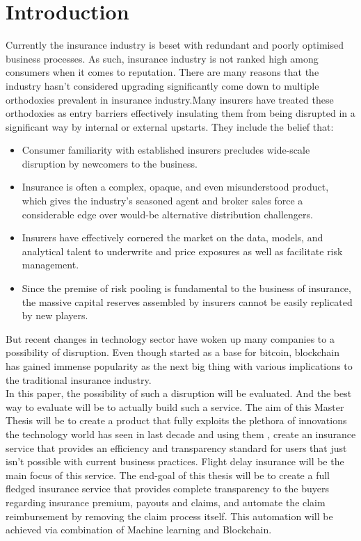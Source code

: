 \chapter{Introduction}

Currently the insurance industry is beset with redundant and poorly optimised business processes. As such, insurance industry is not ranked high among consumers when it comes to reputation\cite{lauraMazzucaToops2014HarrisPropertyCasualty360}. There are many reasons that the industry hasn't considered upgrading significantly come down to multiple orthodoxies prevalent in insurance industry.Many insurers have treated these orthodoxies as entry barriers effectively insulating them from being disrupted in a significant way by internal or external upstarts. They include the belief that\cite{Shaw2016InsurersDisrupted}:
\begin{itemize}
    \item Consumer familiarity with established insurers precludes wide-scale disruption by newcomers to the business.
    \item Insurance is often a complex, opaque, and even misunderstood product, which gives the industry’s seasoned agent and broker sales force a considerable edge over would-be alternative distribution challengers.
    \item Insurers have effectively cornered the market on the data, models, and analytical talent to underwrite and price exposures as well as facilitate risk management.
    \item Since the premise of risk pooling is fundamental to the business of insurance, the massive capital reserves assembled by insurers cannot be easily replicated by new players.
\end{itemize}

But recent changes in technology sector have woken up many companies to a possibility of disruption. Even though started as a base for bitcoin, blockchain has gained immense popularity as the next big thing with various implications to the traditional insurance industry.
\\ In this paper, the possibility of such a disruption will be evaluated. And the best way to evaluate will be to actually build such a service. The aim of this Master Thesis will be to create a product that fully exploits the plethora of innovations the technology world has seen in last decade and using them , create an insurance service that provides an efficiency and transparency standard for users that just isn't possible with current business practices. Flight delay insurance will be the main focus of this service. The end-goal of this thesis will be to create a full fledged insurance service that provides complete transparency to the buyers regarding insurance premium, payouts and claims, and automate the claim reimbursement by removing the claim process itself. This automation will be achieved via combination of Machine learning and Blockchain.

